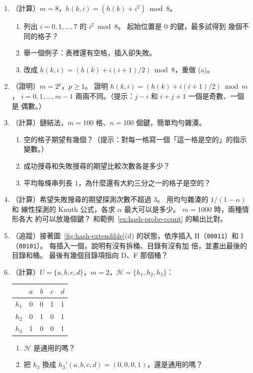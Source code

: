 \begin{enumerate}
\item （計算）$m = 8$，$h(k, i) = (h(k) + i^2) \bmod 8$。
\begin{enumerate}[nosep]
\item 列出 $i = 0, 1, \ldots, 7$ 的 $i^2 \bmod 8$。 起始位置是 $0$ 的鍵，最多試得到
幾個不同的格子？
\item 舉一個例子：表裡還有空格，插入卻失敗。
\item 改成 $h(k, i) = (h(k) + i(i+1)/2) \bmod 8$，重做 (a)。
\end{enumerate}

\item （證明）$m = 2^p$，$p \ge 1$。 證明 $h(k, i) = (h(k) + i(i+1)/2) \bmod m$，
$i = 0, 1, \ldots, m - 1$ 兩兩不同。（提示：$j - i$ 和 $i + j + 1$ 一個是奇數、一個是
偶數。）

\item （計算）鏈結法，$m = 100$ 格、$n = 100$ 個鍵，簡單均勻雜湊。
\begin{enumerate}[nosep]
\item 空的格子期望有幾個？（提示：對每一格寫一個「這一格是空的」的指示變數。）
\item 成功搜尋和失敗搜尋的期望比較次數各是多少？
\item 平均每條串列長 $1$，為什麼還有大約三分之一的格子是空的？
\end{enumerate}

\item （計算）希望失敗搜尋的期望探測次數不超過 $3$。 用均勻雜湊的 $1/(1-\alpha)$ 和
線性探測的 Knuth 公式，各求 $\alpha$ 最大可以是多少。 $m = 1000$ 時，兩種情形各大
約可以放幾個鍵？ 和範例~\ref{ex:hash-probe-count} 的輸出比對。

\item （追蹤）接著圖~\ref{fig:hash-extendible}(d) 的狀態，依序插入
H（\texttt{00011}）和 I（\texttt{00101}）。 每插入一個，說明有沒有拆桶、目錄有沒有加
倍，並畫出最後的目錄和桶。 最後有幾個目錄項指向 D、F 那個桶？

\item （計算）$U = \{a, b, c, d\}$，$m = 2$，$\mathcal{H} = \{h_1, h_2, h_3\}$：
\begin{center}
\begin{tabular}{ccccc}
\toprule
 & $a$ & $b$ & $c$ & $d$ \\
\midrule
$h_1$ & 0 & 0 & 1 & 1 \\
$h_2$ & 0 & 1 & 0 & 1 \\
$h_3$ & 1 & 0 & 0 & 1 \\
\bottomrule
\end{tabular}
\end{center}
\begin{enumerate}[nosep]
\item $\mathcal{H}$ 是通用的嗎？
\item 把 $h_3$ 換成 $h_3'(a, b, c, d) = (0, 0, 0, 1)$，還是通用的嗎？
\end{enumerate}


\end{enumerate}
